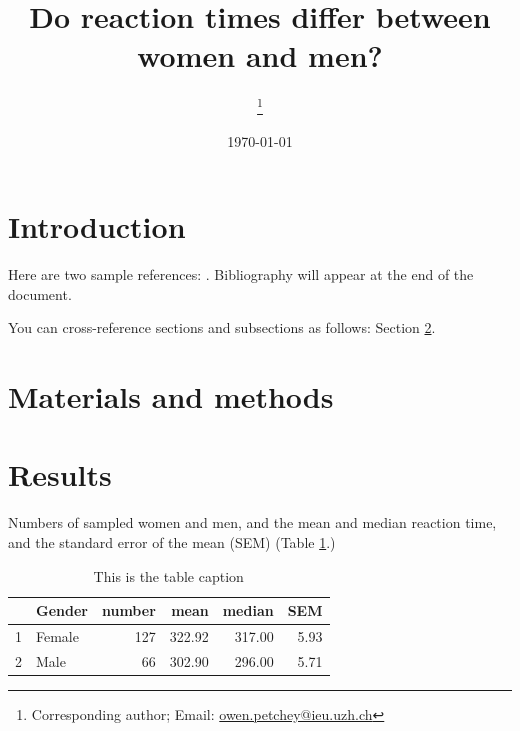 \documentclass[12pt,halfline,a4paper,]{ouparticle}
\begin{document}
\title{Do reaction times differ between women and men?}

\author{%
\address{University of Zurich}\thanks{Corresponding author; Email: \href{mailto:owen.petchey@ieu.uzh.ch}{owen.petchey@ieu.uzh.ch}}
\and
{}\address{Your University}
}


\date{\today}


\maketitle



\hypertarget{introduction}{%
\section{Introduction}\label{introduction}}

Here are two sample references: \citeauthor{Feynman1963118}
\citetext{\citeyear{Feynman1963118}; \citealp{Dirac1953888}}.
Bibliography will appear at the end of the document.

You can cross-reference sections and subsections as follows: Section
\ref{materials-and-methods}.

\hypertarget{materials-and-methods}{%
\section{Materials and methods}\label{materials-and-methods}}

\hypertarget{results}{%
\section{Results}\label{results}}

Numbers of sampled women and men, and the mean and median reaction time,
and the standard error of the mean (SEM) (Table
\ref{tab:summary-stats}.)

\begin{table}[ht]
\centering
\begin{tabular}{rlrrrr}
  \hline
 & Gender & number & mean & median & SEM \\ 
  \hline
1 & Female & 127 & 322.92 & 317.00 & 5.93 \\ 
  2 & Male &  66 & 302.90 & 296.00 & 5.71 \\ 
   \hline
\end{tabular}
\caption{This is the table caption} 
\label{tab:summary-stats}
\end{table}
\end{document}
